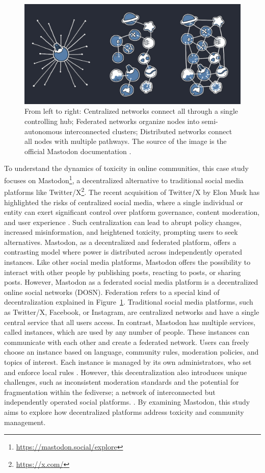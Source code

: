 \begin{figure}[tb]
  \centering
  \includegraphics[width=\textwidth]{../material/network_models.jpg}
  \caption[mastodon]{From left to right: Centralized networks connect all through a single controlling hub; Federated networks organize nodes into semi-autonomous interconnected clusters; Distributed networks connect all nodes with multiple pathways. The source of the image is the official Mastodon documentation \cite{mastodon:docs}.}
  \label{network-models}
\end{figure}

To understand the dynamics of toxicity in online communities, this case study focuses on Mastodon\footnote{\url{https://mastodon.social/explore}}, a decentralized alternative to traditional social media platforms like Twitter/X\footnote{\url{https://x.com/}}. The recent acquisition of Twitter/X by Elon Musk has highlighted the risks of centralized social media, where a single individual or entity can exert significant control over platform governance, content moderation, and user experience \cite{he:2023}. Such centralization can lead to abrupt policy changes, increased misinformation, and heightened toxicity, prompting users to seek alternatives. Mastodon, as a decentralized and federated platform, offers a contrasting model where power is distributed across independently operated instances. Like other social media platforms, Mastodon offers the possibility to interact with other people by publishing posts, reacting to posts, or sharing posts. However, Mastodon as a federated social media platform is a decentralized online social networks (DOSN). Federation refers to a special kind of decentralization explained in Figure~\ref{network-models}. Traditional social media platforms, such as Twitter/X, Facebook, or Instagram, are centralized networks and have a single central service that all users access. In contrast, Mastodon has multiple services, called instances, which are used by any number of people. These instances can communicate with each other and create a federated network. Users can freely choose an instance based on language, community rules, moderation policies, and topics of interest. Each instance is managed by its own administrators, who set and enforce local rules \cite{mastodon:docs}. However, this decentralization also introduces unique challenges, such as inconsistent moderation standards and the potential for fragmentation within the fediverse; a network of interconnected but independently operated social platforms. \cite{he:2023}. By examining Mastodon, this study aims to explore how decentralized platforms address toxicity and community management.

